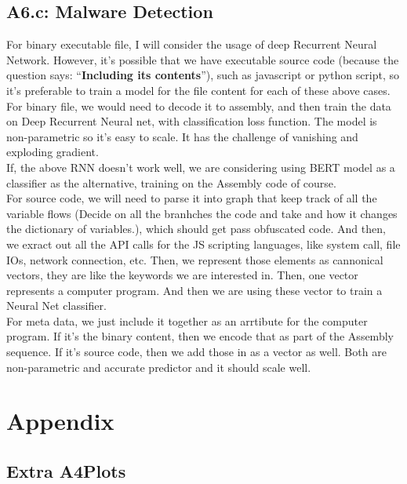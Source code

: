 \documentclass[]{article}
\begin{document}
    \subsection*{A6.c: Malware Detection}
        For binary executable file, I will consider the usage of deep Recurrent Neural Network. However, it's possible that we have executable source code (because the question says: ``\textbf{Including its contents}''), such as javascript or python script, so it's preferable to train a model for the file content for each of these above cases. 
        \\[1.1em]
        For binary file, we would need to decode it to assembly, and then train the data on Deep Recurrent Neural net, with classification loss function. The model is non-parametric so it's easy to scale. It has the challenge of vanishing and exploding gradient. 
        \\[1.1em]
        If, the above RNN doesn't work well, we are considering using BERT model as a classifier as the alternative, training on the Assembly code of course. 
        \\[1.1em]
        For source code, we will need to parse it into graph that keep track of all the variable flows (Decide on all the branhches the code and take and how it changes the dictionary of variables.), which should get pass obfuscated code. And then, we exract out all the API calls for the JS scripting languages, like system call, file IOs, network connection, etc. Then, we represent those elements as cannonical vectors, they are like the keywords we are interested in. Then, one vector represents a computer program. And then we are using these vector to train a Neural Net classifier. 
        \\[1.1em]
        For meta data, we just include it together as an arrtibute for the computer program. If it's the binary content, then we encode that as part of the Assembly sequence. If it's source code, then we add those in as a vector as well. Both are non-parametric and accurate predictor and it should scale well. 

\section*{Appendix}
    \subsection*{Extra A4Plots}
\end{document}
